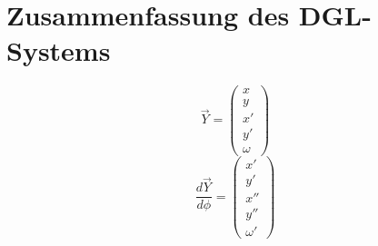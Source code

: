 \section{Zusammenfassung des DGL-Systems}
\[ \vec{Y} = \begin{pmatrix} x \\ y \\ x' \\ y' \\ \omega \end{pmatrix} \]
\[ \frac{d\vec{Y}}{d\phi} = \begin{pmatrix} x' \\ y' \\ x'' \\ y'' \\ \omega' \end{pmatrix} \]